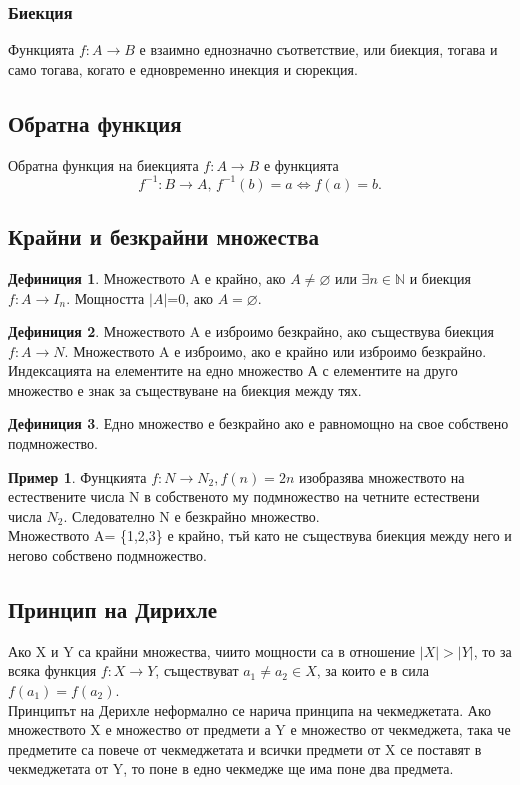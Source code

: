 \documentclass[fleqn, 12pt]{article}
\theoremstyle{definition}
\newtheorem{example}{Пример}[subsection]
\newtheorem{definition}{Дефиниция}[subsection]
\begin{document}
\subsubsection{Биекция}
Функцията $f: A \rightarrow B$ е взаимно еднозначно съответствие, или биекция, тогава и само тогава, когато е едновременно инекция и сюрекция.

\subsection{Обратна функция}
Обратна функция на биекцията $f: A \rightarrow B$ е функцията 
$$f^{-1}:B \rightarrow A, \, f^{-1}(b) = a \Leftrightarrow f(a) = b.$$

\subsection{Крайни и безкрайни множества}

\begin{definition}
Множеството A е крайно, ако $ A \neq \varnothing $ или $\exists n \in \mathbb{N} $ и биекция $f: A \rightarrow I_n$. Мощността $\vert A \vert $=0, ако $ A = \varnothing $.
\end{definition}

\begin{definition}
Множеството A е изброимо безкрайно, ако съществува биекция $f: A \rightarrow N$. Множеството A е изброимо, ако е крайно или изброимо безкрайно. \\
Индексацията на елементите на едно множество А с елементите на друго множество е знак за съществуване на биекция между тях. 
\end{definition}

\begin{definition}
Едно множество е безкрайно ако е равномощно на свое собствено подмножество.
\end{definition}

\begin{example}
Фунцкията $f: N \rightarrow N_2, f(n) = 2n$ изобразява множеството на естествените числа N в собственото му подмножество на четните естествени числа $N_2$. Следователно 
N е безкрайно множество. \\
Множеството A= \{1,2,3\} е крайно, тъй като не съществува биекция между него и негово собствено подмножество.
\end{example}

\subsection{Принцип на Дирихле}
Ако X и Y са крайни множества, чиито мощности са в отношение $ \vert X \vert > \vert Y \vert $, то за всяка функция $f: X \rightarrow Y$, съществуват $a_1 \neq a_2 \in X$, за които е в сила $f(a_1)=f(a_2)$.\\
Принципът на Дерихле неформално се нарича принципа на чекмеджетата. Ако множеството X е множество от предмети а Y е множество от чекмеджета, така че предметите са повече от чекмеджетата и всички предмети от X се поставят в чекмеджетата от Y, то поне в едно чекмедже ще има поне два предмета.
\end{document}
